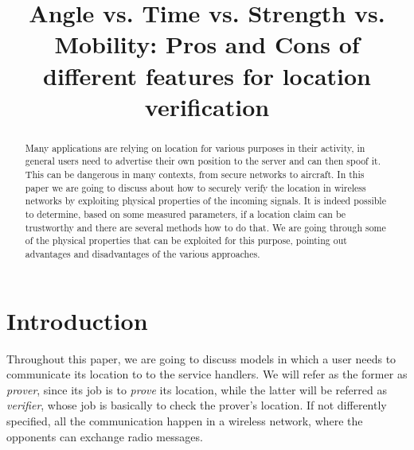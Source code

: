 \documentclass[conference]{IEEEtran}
\begin{document}
\title{Angle vs. Time vs. Strength vs. Mobility: Pros and Cons of different features for location verification}

\author{
    \and
    \and
}

\maketitle

\begin{abstract}
    Many applications are relying on location for various purposes in their activity, in general users need to advertise their own position to the server and can then spoof it. This can be dangerous in many contexts, from secure networks to aircraft. In this paper we are going to discuss about how to securely verify the location in wireless networks by exploiting physical properties of the incoming signals. It is indeed possible to determine, based on some measured parameters, if a location claim can be trustworthy and there are several methods how to do that. We are going through some of the physical properties that can be exploited for this purpose, pointing out advantages and disadvantages of the various approaches.
\end{abstract}

\section{Introduction}
Throughout this paper, we are going to discuss models in which a user needs to communicate its location to to the service handlers. We will refer as the former as \emph{prover}, since its job is to \emph{prove} its location, while the latter will be referred as \emph{verifier}, whose job is basically to check the prover's location. If not differently specified, all the communication happen in a wireless network, where the opponents can exchange radio messages.
\end{document}

